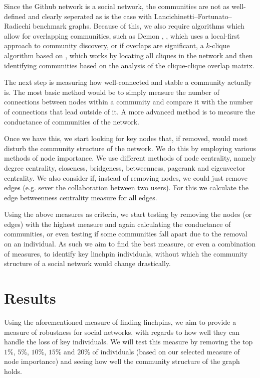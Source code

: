 \documentclass[9pt,twocolumn,twoside]{pnas-new}
\begin{document}
Since the Github network is a social network, the communities are not as well-defined and clearly seperated as is the case with Lancichinetti–Fortunato–Radicchi benchmark graphs.
Because of this, we also require algorithms which allow for overlapping communities, 
such as Demon \cite{Demon}, \cite{coscia-rossetti}, which uses a local-first approach to community discovery, or if overlaps are significant,
a $k$-clique algorithm based on \cite{palla-derenyi}, which works by locating all cliques in the network and then identifying communities based on the analysis of the clique-clique overlap matrix.

The next step is measuring how well-connected and stable a community actually is.
The most basic method would be to simply measure the number of connections between nodes within a community and compare it with the number of connections that lead outside of it.
A more advanced method is to measure the conductance \cite{leskovec-lang-mahoney} of communities of the network. 

Once we have this, we start looking for key nodes that, if removed, would most disturb the community structure of the network.
We do this by employing various methods of node importance.
We use different methods of node centrality, namely degree centrality, closeness, bridgeness, betweenness, pagerank and eigenvector centrality.
We also consider if, instead of removing nodes, we could just remove edges (e.g. sever the collaboration between two users).
For this we calculate the edge betweenness centrality measure for all edges.

Using the above measures as criteria, we start testing by removing the nodes (or edges) with the highest measure and 
again calculating the conductance of communities, 
or even testing if some communities fall apart due to the removal on an individual.
As such we aim to find the best measure, or even a combination of measures, to identify key linchpin individuals, 
without which the community structure of a social network would change drastically.

\section*{Results}

Using the aforementioned measure of finding linchpins, we aim to provide a measure of robustness for social networks,
with regards to how well they can handle the loss of key individuals. 
We will test this measure by removing the top $1\%$, $5\%$, $10\%$, $15\%$ and $20\%$ of individuals (based on our selected measure of node importance) 
and seeing how well the community structure of the graph holds.



\end{document}
